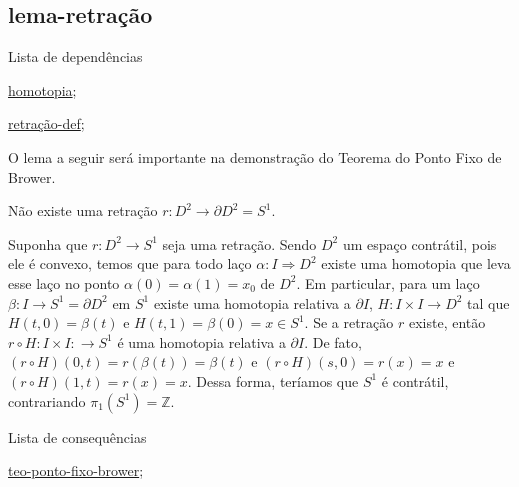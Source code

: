 \subsection{lema-retração} %
\label{lema-retração}
\begin{titlemize}{Lista de dependências}
	\item \hyperref[homotopia]{homotopia};\\ %
	\item \hyperref[retração-def]{retração-def};\\
\end{titlemize}
O lema a seguir será importante na demonstração do Teorema do Ponto Fixo de Brower.
\begin{lemma}[Lema da Retração]%
	Não existe uma retração $r:D^2 \longrightarrow \partial D^2 = S^1$.
\end{lemma}

\begin{dem}
Suponha que $r:D^2 \longrightarrow S^1$ seja uma retração. Sendo $D^2$ um espaço contrátil, pois ele é convexo, temos que para todo laço $\alpha: I \Longrightarrow D^2$ existe uma homotopia que leva esse laço no ponto $\alpha(0) = \alpha(1) = x_0$ de $D^2$. Em particular, para um laço $\beta: I \longrightarrow S^1 = \partial D^2$ em $S^1$ existe uma homotopia relativa a $\partial I$, $H: I\times I \longrightarrow D^2$ tal que $H(t, 0) = \beta(t)$ e $H(t, 1) = \beta(0) = x \in S^1$. Se a retração $r$ existe, então $r\circ H: I\times I: \longrightarrow S^1$ é uma homotopia relativa a $\partial I$. De fato, $(r\circ H)(0, t) = r(\beta(t)) = \beta(t)$ e $(r\circ H)(s, 0) = r(x) = x$ e $(r\circ H)(1, t) = r(x) = x$. Dessa forma, teríamos que $S^1$ é contrátil, contrariando $\pi_1(S^1) = \mathbb{Z}$.
\end{dem}

\begin{titlemize}{Lista de consequências}
	\item \hyperref[teo-ponto-fixo-brower]{teo-ponto-fixo-brower};\\ %
\end{titlemize}

